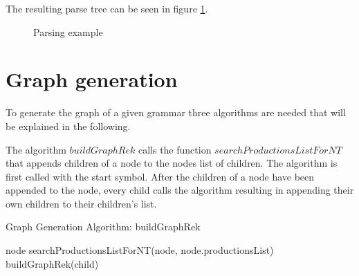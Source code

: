 The resulting parse tree can be seen in figure \ref{fig:ImplementationParsing}. 

\begin{figure}[H]
\caption{Parsing example}
\label{fig:ImplementationParsing}
\end{figure}
                
                
                
\section{Graph generation}\label{sec:ImplementationGraphGeneration}

To generate the graph of a given grammar three algorithms are needed that will be explained in the following. 

The algorithm $buildGraphRek$ calls the function $searchProductionsListForNT$ that appends children of a node to the nodes list of children. The algorithm is first called with the start symbol. 
After the children of a node have been appended to the node, every child calls the algorithm resulting in appending their own children to their children's list. 

\begin{algorithm}[H]
\caption{Graph Generation Algorithm: buildGraphRek}
\begin{algorithmic}[1] 
\Require node
\State searchProductionsListForNT(node, node.productionsList)
		\State buildGraphRek(child)
	\EndFor
\EndIf
\end{algorithmic}
\end{algorithm}

